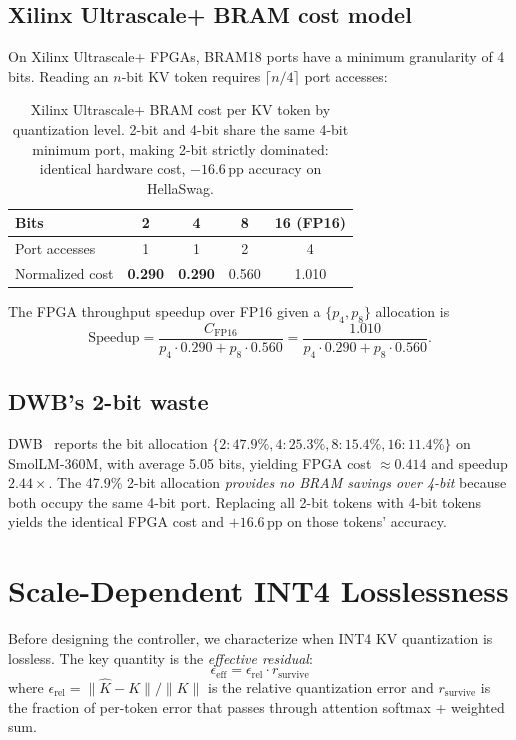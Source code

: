 \documentclass{article}
\begin{document}
\subsection{Xilinx Ultrascale+ BRAM cost model}
On Xilinx Ultrascale+ FPGAs, BRAM18 ports have a minimum granularity of 4 bits. Reading an $n$-bit KV token requires $\lceil n/4 \rceil$ port accesses:

\begin{table}[h]
\centering
\caption{Xilinx Ultrascale+ BRAM cost per KV token by quantization level. 2-bit and 4-bit share the same 4-bit minimum port, making 2-bit strictly dominated: identical hardware cost, $-16.6$\,pp accuracy on HellaSwag.}
\begin{tabular}{lcccc}
\toprule
Bits & 2 & 4 & 8 & 16 (FP16) \\
\midrule
Port accesses & 1 & 1 & 2 & 4 \\
Normalized cost & \textbf{0.290} & \textbf{0.290} & 0.560 & 1.010 \\
\bottomrule
\end{tabular}
\label{tab:bram}
\end{table}

The FPGA throughput speedup over FP16 given a $\{p_4, p_8\}$ allocation is
\[
\text{Speedup} = \frac{C_\text{FP16}}{p_4 \cdot 0.290 + p_8 \cdot 0.560} = \frac{1.010}{p_4 \cdot 0.290 + p_8 \cdot 0.560}.
\]

\subsection{DWB's 2-bit waste}
DWB~\citep{haeri2026dwb} reports the bit allocation $\{2: 47.9\%, 4: 25.3\%, 8: 15.4\%, 16: 11.4\%\}$ on SmolLM-360M, with average 5.05 bits, yielding FPGA cost $\approx 0.414$ and speedup $2.44\times$. The 47.9\% 2-bit allocation \emph{provides no BRAM savings over 4-bit} because both occupy the same 4-bit port. Replacing all 2-bit tokens with 4-bit tokens yields the identical FPGA cost and $+16.6$\,pp on those tokens' accuracy.

\section{Scale-Dependent INT4 Losslessness}
\label{sec:scale}

Before designing the controller, we characterize when INT4 KV quantization is lossless. The key quantity is the \emph{effective residual}:
\[
\epsilon_\text{eff} = \epsilon_\text{rel} \cdot r_\text{survive}
\]
where $\epsilon_\text{rel} = \|\hat{K} - K\|/\|K\|$ is the relative quantization error and $r_\text{survive}$ is the fraction of per-token error that passes through attention softmax + weighted sum.
\end{document}
